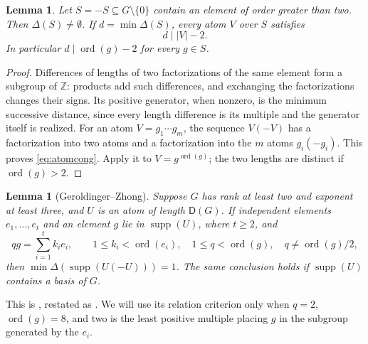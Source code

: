 \documentclass[11pt]{article}
\newtheorem{lemma}[theorem]{Lemma}
\theoremstyle{definition}
\newcommand{\D}{\mathsf D}
\newcommand{\supp}{\operatorname{supp}}
\newcommand{\ord}{\operatorname{ord}}
\begin{document}
\begin{lemma}\label{lem:distance}
Let $S=-S\subseteq G\setminus\{0\}$ contain an element of order greater than two. Then $\Delta(S)\neq\emptyset$. If $d=\min\Delta(S)$, every atom $V$ over $S$ satisfies
\begin{equation}\label{eq:atomcong}
 d\mid |V|-2.
\end{equation}
In particular $d\mid\ord(g)-2$ for every $g\in S$.
\end{lemma}
\begin{proof}
Differences of lengths of two factorizations of the same element form a subgroup of $\mathbb Z$: products add such differences, and exchanging the factorizations changes their signs. Its positive generator, when nonzero, is the minimum successive distance, since every length difference is its multiple and the generator itself is realized. For an atom $V=g_1\cdots g_m$, the sequence $V(-V)$ has a factorization into two atoms and a factorization into the $m$ atoms $g_i(-g_i)$. This proves \eqref{eq:atomcong}. Apply it to $V=g^{\ord(g)}$; the two lengths are distinct if $\ord(g)>2$.
\end{proof}

\begin{lemma}[Geroldinger--Zhong]\label{lem:gz}
Suppose $G$ has rank at least two and exponent at least three, and $U$ is an atom of length $\D(G)$. If independent elements $e_1,\ldots,e_t$ and an element $g$ lie in $\supp(U)$, where $t\geq2$, and
\[
 qg=\sum_{i=1}^t k_i e_i,\qquad
 1\leq k_i<\ord(e_i),\quad
 1\leq q<\ord(g),\quad q\neq\ord(g)/2,
\]
then $\min\Delta(\supp(U(-U)))=1$. The same conclusion holds if $\supp(U)$ contains a basis of $G$.
\end{lemma}

This is \cite[Lemma 3.10]{GZ}, restated as \cite[Lemma 3.1]{BGZ}. We will use its relation criterion only when $q=2$, $\ord(g)=8$, and two is the least positive multiple placing $g$ in the subgroup generated by the $e_i$.
\end{document}
